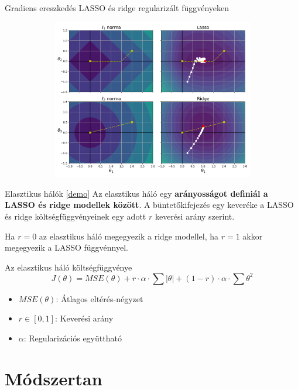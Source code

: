 \documentclass[english, aspectratio=169]{beamer}
\makeatletter
\let\origtableofcontents=\tableofcontents
\def\tableofcontents{\@ifnextchar[{\origtableofcontents}{\gobbletableofcontents}}
\def\gobbletableofcontents#1{\origtableofcontents}
\makeatother
\begin{document}
\begin{frame}{Gradiens ereszkedés LASSO és ridge regularizált függvényeken}
\begin{center}
\includegraphics[width=14cm, height=7cm, keepaspectratio]{images/regularization_15.png}
\end{center}
\end{frame}

\begin{frame}{Elasztikus hálók [\href{https://www.geogebra.org/m/j9kh3ju2}{demo}]}
Az elasztikus háló egy \textbf{arányosságot definiál a LASSO és ridge modellek között}. A büntetőkifejezés egy keveréke a LASSO és ridge költségfüggvényeinek egy adott $r$ keverési arány szerint.\par\smallskip
Ha $r=0$ az elasztikus háló megegyezik a ridge modellel, ha $r=1$ akkor megegyezik a LASSO függvénnyel. 
\begin{block}{Az elasztikus háló költségfüggvénye}
\[
J\left( \theta \right) = MSE\left( \theta \right) + r \cdot \alpha \cdot \sum \left|\theta\right| + \left( 1-r \right) \cdot \alpha \cdot \sum \theta^2
\]
\begin{itemize}
	\item $MSE\left( \theta \right)$: Átlagos eltérés-négyzet
	\item $r \in \left[ 0, 1 \right]$: Keverési arány
	\item $\alpha$: Regularizációs együttható
\end{itemize}
\end{block}
\end{frame}

\section{Módszertan}

\begin{frame}
\tableofcontents[currentsection]
\end{frame}
\end{document}
